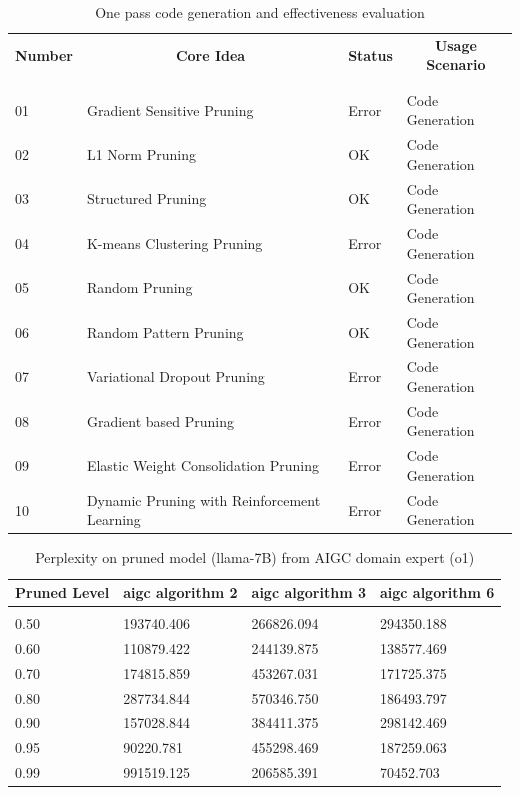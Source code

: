 \documentclass{article} %
\begin{document}
\begin{table}[t]
\caption{One pass code generation and effectiveness evaluation}
\label{table-4}
\begin{center}
\begin{tabular}{llll}
\multicolumn{1}{c}{\bf Number}  &\multicolumn{1}{c}{\bf Core Idea} & \multicolumn{1}{c}{\bf Status} & \multicolumn{1}{c}{\bf Usage Scenario} \\
\\ \hline \\
01         &Gradient Sensitive Pruning & Error & Code Generation \\
02         &L1 Norm Pruning & OK & Code Generation \\
03         &Structured Pruning & OK & Code Generation \\
04         &K-means Clustering Pruning & Error & Code Generation \\
05         &Random Pruning & OK & Code Generation \\
06         &Random Pattern Pruning & OK & Code Generation \\
07         &Variational Dropout Pruning & Error & Code Generation \\
08         &Gradient based Pruning & Error & Code Generation \\
09         &Elastic Weight Consolidation Pruning & Error & Code Generation \\
10         &Dynamic Pruning with Reinforcement Learning & Error & Code Generation \\
\end{tabular}
\end{center}
\end{table}

\begin{table}[t]
\caption{Perplexity on pruned model (llama-7B) from AIGC domain expert (o1)}
\label{table-5}
\begin{center}
\begin{tabular}{llll}
\multicolumn{1}{c}{\bf Pruned Level}  &\multicolumn{1}{c}{\bf aigc algorithm 2} & \multicolumn{1}{c}{\bf aigc algorithm 3} & \multicolumn{1}{c}{\bf aigc algorithm 6} \\
\hline \\
0.50         &193740.406 & 266826.094 & 294350.188 \\
0.60         &110879.422 & 244139.875 & 138577.469 \\
0.70         &174815.859 & 453267.031 & 171725.375 \\
0.80         &287734.844 & 570346.750 & 186493.797 \\
0.90         &157028.844 & 384411.375 & 298142.469 \\
0.95         &90220.781  & 455298.469 & 187259.063 \\
0.99         &991519.125 & 206585.391 & 70452.703 \\
\end{tabular}
\end{center}
\end{table}
\end{document}
